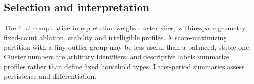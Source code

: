 \subsection{Selection and interpretation}
The final comparative interpretation weighs cluster sizes, within-space geometry, fixed-count ablation, stability and intelligible profiles. A score-maximizing partition with a tiny outlier group may be less useful than a balanced, stable one. Cluster numbers are arbitrary identifiers, and descriptive labels summarize profiles rather than define fixed household types. Later-period summaries assess persistence and differentiation.
